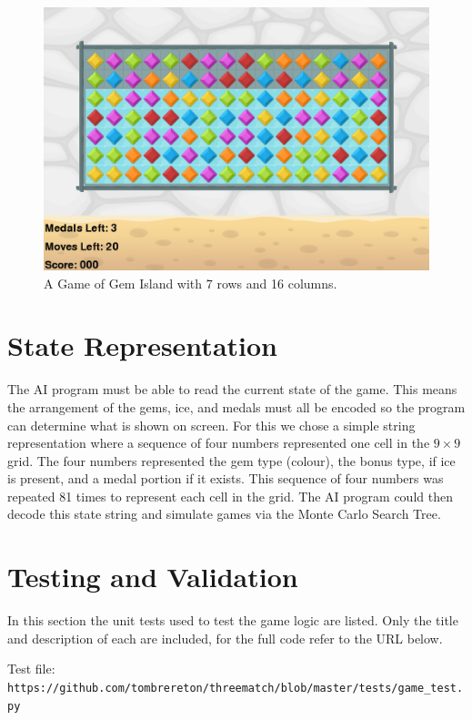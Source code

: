 \documentclass{bhamthesis}
\theoremstyle{definition}
\begin{document}
\begin{figure}
	\centering
	\includegraphics[width=\textwidth]{media/img/gemIslandRect}
	\caption{A Game of Gem Island with 7 rows and 16 columns.}\label{f:gemRect}
\end{figure}

\section{State Representation}\label{s:state}
The AI program must be able to read the current state of the game. This means the arrangement of the gems, ice, and medals must all be encoded so the program can determine what is shown on screen. For this we chose a simple string representation where a sequence of four numbers represented one cell in the $9 \times 9$ grid. The four numbers represented the gem type (colour), the bonus type, if ice is present, and a medal portion if it exists. This sequence of four numbers was repeated 81 times to represent each cell in the grid. The AI program could then decode this state string and simulate games via the Monte Carlo Search Tree.

\section{Testing and Validation}
In this section the unit tests used to test the game logic are listed. Only the title and description of each are included, for the full code refer to the URL below.

Test file:\\
 \verb|https://github.com/tombrereton/threematch/blob/master/tests/game_test.py|
\end{document}
